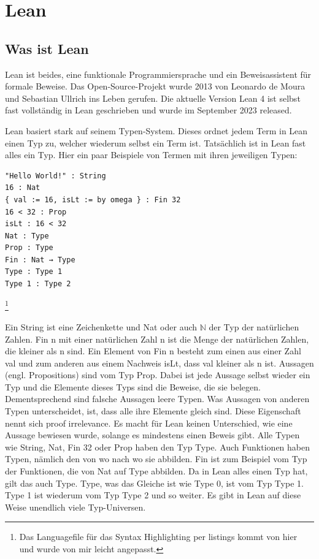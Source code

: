 \section{Lean}
\subsection{Was ist Lean}
Lean\cite{10.1007/978-3-030-79876-5_37} ist beides, eine funktionale Programmiersprache und ein Beweisassistent für formale Beweise.
Das Open-Source-Projekt wurde 2013 von Leonardo de Moura und Sebastian Ullrich ins Leben gerufen.
Die aktuelle Version Lean 4 ist selbst fast vollständig in Lean geschrieben und wurde im September 2023 released.

Lean basiert stark auf seinem Typen-System.
Dieses ordnet jedem Term in Lean einen Typ zu, welcher wiederum selbst ein Term ist.
Tatsächlich ist in Lean fast alles ein Typ.
Hier ein paar Beispiele von Termen mit ihren jeweiligen Typen:

\begin{lstlisting}
"Hello World!" : String
16 : Nat
{ val := 16, isLt := by omega } : Fin 32
16 < 32 : Prop
isLt : 16 < 32
Nat : Type
Prop : Type
Fin : Nat → Type
Type : Type 1
Type 1 : Type 2
\end{lstlisting}
\footnote{Das Languagefile für das Syntax Highlighting per listings kommt von hier \cite{syntax} und wurde von mir leicht angepasst.}

Ein String ist eine Zeichenkette und Nat oder auch $\mathbb{N}$ der Typ der natürlichen Zahlen.
Fin n mit einer natürlichen Zahl n ist die Menge der natürlichen Zahlen, die kleiner als n sind.
Ein Element von Fin n besteht zum einen aus einer Zahl val und zum anderen aus einem Nachweis isLt, dass val kleiner als n ist.
Aussagen (engl. Propositions) sind vom Typ Prop.
Dabei ist jede Aussage selbst wieder ein Typ und die Elemente dieses Typs sind die Beweise, die sie belegen.
Dementsprechend sind falsche Aussagen leere Typen.
Was Aussagen von anderen Typen unterscheidet, ist, dass alle ihre Elemente gleich sind.
Diese Eigenschaft nennt sich \glqq proof irrelevance\grqq.
Es macht für Lean keinen Unterschied, wie eine Aussage bewiesen wurde, solange es mindestens einen Beweis gibt.
Alle Typen wie String, Nat, Fin 32 oder Prop haben den Typ Type.
Auch Funktionen haben Typen, nämlich den von wo nach wo sie abbilden.
Fin ist zum Beispiel vom Typ der Funktionen, die von Nat auf Type abbilden.
Da in Lean alles einen Typ hat, gilt das auch Type.
Type, was das Gleiche ist wie Type 0, ist vom Typ Type 1.
Type 1 ist wiederum vom Typ Type 2 und so weiter.
Es gibt in Lean auf diese Weise unendlich viele Typ-Universen.

